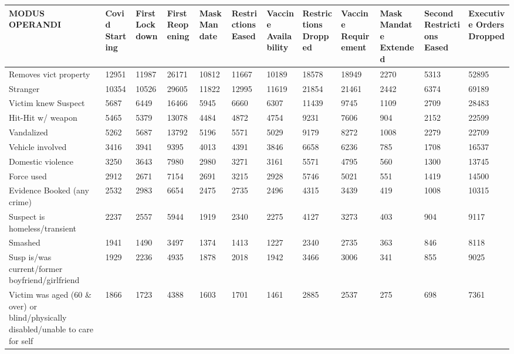 \documentclass{article}
\begin{document}
\pagestyle{empty}

\begin{landscape}
\begin{table}[!ht]
    \centering
    \small
    \begin{tabular}{|p{2cm}|*{11}{p{1.7cm}|}}
    \hline
        \rowcolor{lightgreen}
        MODUS OPERANDI & Covid Starting & First Lockdown & First Reopening & Mask Mandate & Restrictions Eased & Vaccine Availability & Restrictions Dropped & Vaccine Requirement & Mask Mandate Extended & Second Restrictions Eased & Executive Orders Dropped \\ \hline
        Removes vict property & 12951 & 11987 & 26171 & 10812 & 11667 & 10189 & 18578 & 18949 & 2270 & 5313 & 52895 \\ \hline
        Stranger & 10354 & 10526 & 29605 & 11822 & 12995 & 11619 & 21854 & 21461 & 2442 & 6374 & 69189 \\ \hline
        Victim knew Suspect & 5687 & 6449 & 16466 & 5945 & 6660 & 6307 & 11439 & 9745 & 1109 & 2709 & 28483 \\ \hline
        Hit-Hit w/ weapon & 5465 & 5379 & 13078 & 4484 & 4872 & 4754 & 9231 & 7606 & 904 & 2152 & 22599 \\ \hline
        Vandalized & 5262 & 5687 & 13792 & 5196 & 5571 & 5029 & 9179 & 8272 & 1008 & 2279 & 22709 \\ \hline
        Vehicle involved & 3416 & 3941 & 9395 & 4013 & 4391 & 3846 & 6658 & 6236 & 785 & 1708 & 16537 \\ \hline
        Domestic violence & 3250 & 3643 & 7980 & 2980 & 3271 & 3161 & 5571 & 4795 & 560 & 1300 & 13745 \\ \hline
        Force used & 2912 & 2671 & 7154 & 2691 & 3215 & 2928 & 5746 & 5021 & 551 & 1419 & 14500 \\ \hline
        Evidence Booked (any crime) & 2532 & 2983 & 6654 & 2475 & 2735 & 2496 & 4315 & 3439 & 419 & 1008 & 10315 \\ \hline
        Suspect is homeless/transient & 2237 & 2557 & 5944 & 1919 & 2340 & 2275 & 4127 & 3273 & 403 & 904 & 9117 \\ \hline
        Smashed & 1941 & 1490 & 3497 & 1374 & 1413 & 1227 & 2340 & 2735 & 363 & 846 & 8118 \\ \hline
        Susp is/was current/former boyfriend/girlfriend & 1929 & 2236 & 4935 & 1878 & 2018 & 1942 & 3466 & 3006 & 341 & 855 & 9025 \\ \hline
        Victim was aged (60 \& over) or blind/physically disabled/unable to care for self & 1866 & 1723 & 4388 & 1603 & 1701 & 1461 & 2885 & 2537 & 275 & 698 & 7361 \\ \hline

\end{tabular}
\end{table}
\end{landscape}
\end{document}

